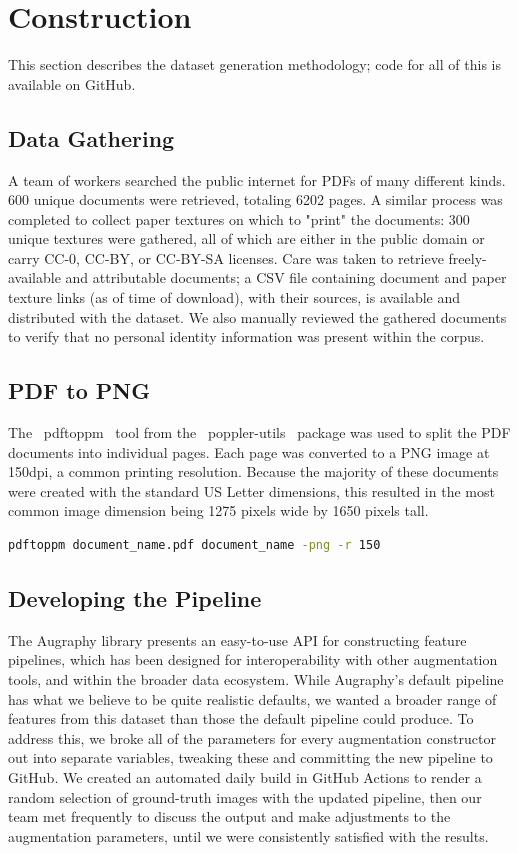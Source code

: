 \documentclass[runningheads]{llncs}
\begin{document}
\section{Construction}
This section describes the dataset generation methodology; code for all of this is available on GitHub.

\subsection{Data Gathering}
A team of workers searched the public internet for PDFs of many different kinds.
600 unique documents were retrieved, totaling 6202 pages.
A similar process was completed to collect paper textures on which to "print" the documents: 300 unique textures were gathered, all of which are either in the public domain or carry CC-0, CC-BY, or CC-BY-SA licenses.
Care was taken to retrieve freely-available and attributable documents; a CSV file containing document and paper texture links (as of time of download), with their sources, is available and distributed with the dataset.
We also manually reviewed the gathered documents to verify that no personal identity information was present within the corpus.

\subsection{PDF to PNG}
The ~pdftoppm~ tool from the ~poppler-utils~ package was used to split the PDF documents into individual pages.
Each page was converted to a PNG image at 150dpi, a common printing resolution.
Because the majority of these documents were created with the standard US Letter dimensions, this resulted in the most common image dimension being 1275 pixels wide by 1650 pixels tall.

\begin{lstlisting}[language=bash]
  pdftoppm document_name.pdf document_name -png -r 150
\end{lstlisting}

\subsection{Developing the Pipeline}
The Augraphy library presents an easy-to-use API for constructing feature pipelines, which has been designed for interoperability with other augmentation tools, and within the broader data ecosystem.
While Augraphy's default pipeline has what we believe to be quite realistic defaults, we wanted a broader range of features from this dataset than those the default pipeline could produce.
To address this, we broke all of the parameters for every augmentation constructor out into separate variables, tweaking these and committing the new pipeline to GitHub.
We created an automated daily build in GitHub Actions to render a random selection of ground-truth images with the updated pipeline, then our team met frequently to discuss the output and make adjustments to the augmentation parameters, until we were consistently satisfied with the results.
\end{document}
